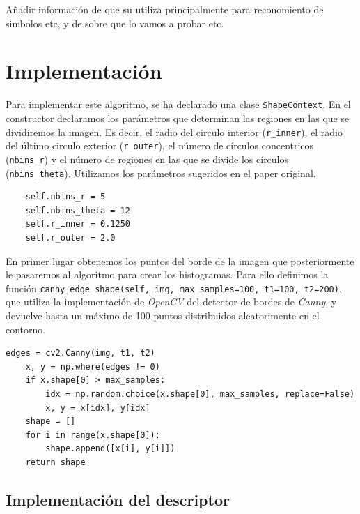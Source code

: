 \documentclass[size=a4, parskip=half, titlepage=false, toc=flat, toc=bib, 12pt]{scrartcl}
\begin{document}
Añadir información de que su utiliza principalmente para reconomiento de simbolos etc, y de sobre que lo vamos a probar etc.

\newpage

\section{Implementación}
Para implementar este algoritmo, se ha declarado una clase \verb|ShapeContext|. En el constructor declaramos los parámetros que determinan las regiones en las que se dividiremos la imagen. Es decir, el radio del circulo interior (\verb|r_inner|), el radio del último circulo exterior (\verb|r_outer|), el número de círculos concentricos (\verb|nbins_r|) y el número de regiones en las que se divide los círculos (\verb|nbins_theta|). Utilizamos los parámetros sugeridos en el paper original.

\begin{verbatim}
    self.nbins_r = 5
    self.nbins_theta = 12
    self.r_inner = 0.1250
    self.r_outer = 2.0
\end{verbatim}

En primer lugar obtenemos los puntos del borde de la imagen que posteriormente le pasaremos al algoritmo para crear los histogramas. Para ello definimos la función \texttt{canny\_edge\_shape(self, img, max\_samples=100, t1=100, t2=200)}, que utiliza la implementación de \textit{OpenCV} del detector de bordes de \textit{Canny}, y devuelve hasta un máximo de 100 puntos distribuidos aleatorimente en el contorno.

\begin{verbatim}
edges = cv2.Canny(img, t1, t2)
    x, y = np.where(edges != 0)
    if x.shape[0] > max_samples:
        idx = np.random.choice(x.shape[0], max_samples, replace=False)
        x, y = x[idx], y[idx]
    shape = []
    for i in range(x.shape[0]):
        shape.append([x[i], y[i]])
    return shape
\end{verbatim}

\subsection{Implementación del descriptor}%
\label{sub:implementación_del_descriptor}
\end{document}
